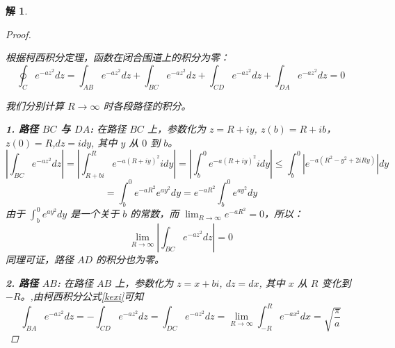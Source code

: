\documentclass[12pt,a4paper]{article}
\newtheorem*{solution}{解}
\begin{document}
\begin{solution}
\begin{proof}
\begin{center}
	\end{center}
	
	根据柯西积分定理，函数在闭合围道上的积分为零：
	\begin{equation}\label{kexi}
		\oint_C e^{-az^2} dz = \int_{AB} e^{-az^2} dz + \int_{BC} e^{-az^2} dz + \int_{CD} e^{-az^2} dz + \int_{DA} e^{-az^2} dz = 0
	\end{equation}
	
	我们分别计算 $R \to \infty$ 时各段路径的积分。
	
	
	
	\textbf{1. 路径 $BC$ 与 $DA$:}
	在路径 $BC$ 上，参数化为 $z = R+iy$, $z(b) = R+ib$，$z(0) = R$,$dz=idy$, 其中 $y$ 从 $0$ 到 $b$。
	\begin{equation*}
		\left| \int_{BC} e^{-az^2} dz \right|= \left| \int_{R+bi}^{R} e^{-a(R+iy)^2} i dy \right|= \left| \int_{b}^{0} e^{-a(R+iy)^2} i dy \right| \le \int_{b}^{0} |e^{-a(R^2 - y^2 + 2iRy)}| dy 
	\end{equation*}
	\begin{equation*}
		= \int_{b}^{0} e^{-aR^2} e^{ay^2} dy = e^{-aR^2} \int_{b}^{0} e^{ay^2} dy
	\end{equation*}
	由于 $\int_{b}^{0} e^{ay^2} dy$ 是一个关于 $b$ 的常数，而 $\lim_{R \to \infty} e^{-aR^2} = 0$，所以：
	\begin{equation*}
		\lim_{R \to \infty} \left| \int_{BC} e^{-az^2} dz \right| = 0
	\end{equation*}
	同理可证，路径 $AD$ 的积分也为零。
	
	\textbf{2. 路径 $AB$:}
	在路径 $AB$ 上，参数化为 $z=x+bi$, $dz=dx$, 其中 $x$ 从 $R$ 变化到 $-R$。,由柯西积分公式\eqref{kexi}可知
	\begin{equation*}
		\int_{BA} e^{-az^2} dz = -	\int_{CD} e^{-az^2} dz = \int_{DC}e^{-az^2} dz= 	\lim_{R \to \infty}\int_{-R}^{R}e^{-ax^2} dx=\sqrt{\frac{\pi}{a}}
	\end{equation*}
	


\end{proof}
\end{solution}
\end{document}
